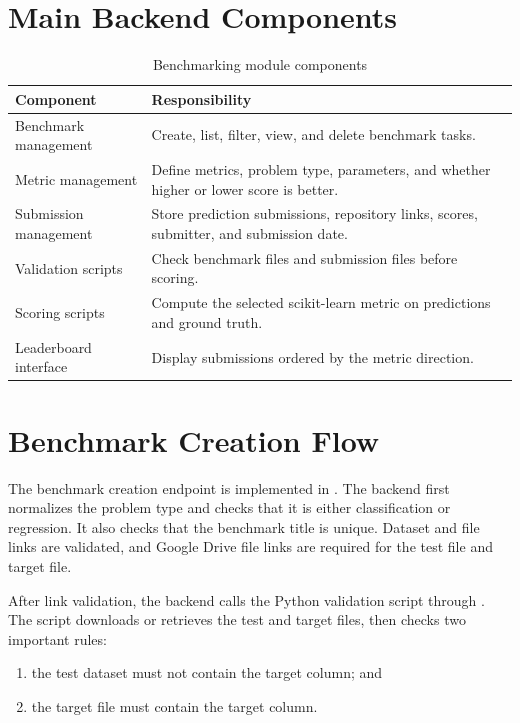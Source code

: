 \documentclass[12pt,a4paper,oneside]{report}
\newcommand{\modulepath}[1]{\texttt{\detokenize{#1}}}
\begin{document}
\section{Main Backend Components}

\begin{table}[H]
\centering
\caption{Benchmarking module components}
\label{tab:benchmark-components}
\begin{tabular}{p{}p{}}
\toprule
Component & Responsibility \\
\midrule
Benchmark management & Create, list, filter, view, and delete benchmark
tasks. \\
Metric management & Define metrics, problem type, parameters, and whether
higher or lower score is better. \\
Submission management & Store prediction submissions, repository links,
scores, submitter, and submission date. \\
Validation scripts & Check benchmark files and submission files before
scoring. \\
Scoring scripts & Compute the selected scikit-learn metric on predictions and
ground truth. \\
Leaderboard interface & Display submissions ordered by the metric direction. \\
\bottomrule
\end{tabular}
\end{table}

\section{Benchmark Creation Flow}

The benchmark creation endpoint is implemented in
\modulepath{routes/benchmark.js}. The backend first normalizes the problem type
and checks that it is either classification or regression. It also checks that
the benchmark title is unique. Dataset and file links are validated, and Google
Drive file links are required for the test file and target file.

After link validation, the backend calls the Python validation script through
\modulepath{run_python}. The script downloads or retrieves the test and target
files, then checks two important rules:

\begin{enumerate}[leftmargin=*]
  \item the test dataset must not contain the target column; and
  \item the target file must contain the target column.
\end{enumerate}
\end{document}
